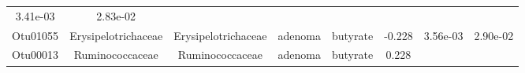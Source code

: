 \documentclass[11pt,]{article}
\begin{document}
\begin{longtable}[]{@{}cccccccc@{}}
\begin{minipage}[t]{0.08\columnwidth}
3.41e-03\strut
\end{minipage} & \begin{minipage}[t]{0.08\columnwidth}\centering\strut
2.83e-02\strut
\end{minipage}\tabularnewline
\begin{minipage}[t]{0.08\columnwidth}\centering\strut
Otu01055\strut
\end{minipage} & \begin{minipage}[t]{0.15\columnwidth}\centering\strut
Erysipelotrichaceae\strut
\end{minipage} & \begin{minipage}[t]{0.15\columnwidth}\centering\strut
Erysipelotrichaceae\strut
\end{minipage} & \begin{minipage}[t]{0.08\columnwidth}\centering\strut
adenoma\strut
\end{minipage} & \begin{minipage}[t]{0.09\columnwidth}\centering\strut
butyrate\strut
\end{minipage} & \begin{minipage}[t]{0.07\columnwidth}\centering\strut
-0.228\strut
\end{minipage} & \begin{minipage}[t]{0.08\columnwidth}\centering\strut
3.56e-03\strut
\end{minipage} & \begin{minipage}[t]{0.08\columnwidth}\centering\strut
2.90e-02\strut
\end{minipage}\tabularnewline
\begin{minipage}[t]{0.08\columnwidth}\centering\strut
Otu00013\strut
\end{minipage} & \begin{minipage}[t]{0.15\columnwidth}\centering\strut
Ruminococcaceae\strut
\end{minipage} & \begin{minipage}[t]{0.15\columnwidth}\centering\strut
Ruminococcaceae\strut
\end{minipage} & \begin{minipage}[t]{0.08\columnwidth}\centering\strut
adenoma\strut
\end{minipage} & \begin{minipage}[t]{0.09\columnwidth}\centering\strut
butyrate\strut
\end{minipage} & \begin{minipage}[t]{0.07\columnwidth}\centering\strut
0.228\strut
\end{minipage} & \begin{minipage}[t]{0.08\columnwidth}\centering\strut

\end{minipage}
\end{longtable}
\end{document}

